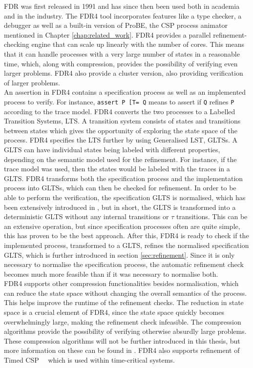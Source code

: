FDR was first released in 1991 and has since then been used both in academia and in the industry. The FDR4 tool incorporates features like a \cspm{} type checker, a debugger as well as a built-in version of ProBE, the CSP process animator mentioned in Chapter \ref{chap:related_work}. FDR4 provides a parallel refinement-checking engine that can scale up linearly with the number of cores. This means that it can handle processes with a very large number of states in a reasonable time, which, along with compression, provides the possibility of verifying even larger problems. FDR4 also provide a cluster version, also providing verification of larger problems.\\

An assertion in FDR4 contains a specification process as well as an implemented process to verify. For instance, \texttt{assert P [T= Q} means to assert if \texttt{Q} refines \texttt{P} according to the trace model.
FDR4 converts the two processes to a Labelled Transition Systems, LTS. A transition system consists of states and transitions between states which gives the opportunity of exploring the state space of the process.
FDR4 specifies the LTS further by using Generalised LST, GLTSs. A GLTS can have individual states being labeled with different properties, depending on the semantic model used for the refinement. For instance, if the trace model was used, then the states would be labeled with the traces in a GLTS.
FDR4 transforms both the specification process and the implementation process into GLTSs, which can then be checked for refinement. In order to be able to perform the verification, the specification GLTS is normalised, which has been extensively introduced in \cite{Roscoe1997}, but in short, the GLTS is transformed into a deterministic GLTS without any internal transitions or $\tau$ transitions. This can be an extensive operation, but since specification processes often are quite simple, this has proven to be the best approach.
After this, FDR4 is ready to check if the implemented process, transformed to a GLTS, refines the normalised specification GLTS, which is further introduced in section \ref{sec:refinement}. Since it is only necessary to normalise the specification process, the automatic refinement check becomes much more feasible than if it was necessary to normalise both. \\

FDR4 supports other compression functionalities besides normalisation, which can reduce the state space without changing the overall semantics of the process. This helps improve the runtime of the refinement checks. The reduction in state space is a crucial element of FDR4, since the state space quickly becomes overwhelmingly large, making the refinement check infeasible. The compression algorithms provide the possibility of verifying otherwise absurdly large problems.
These compression algorithms will not be further introduced in this thesis, but more information on these can be found in \cite{Roscoe2010}.
FDR4 also supports refinement of Timed CSP~\cite{REED1988249}~\cite{Armstrong2011} which is used within time-critical systems.
